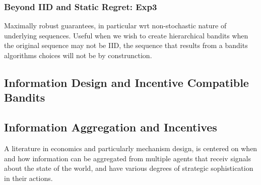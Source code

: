 \subsubsection{Beyond IID and Static Regret: Exp3}

 Maximally robust guarantees, in particular wrt non-stochastic nature of underlying sequences. Useful when we wish to create hierarchical bandits when the original sequence may not be IID, the sequence that results from a bandits algorithms choices will not be by construnction.



\subsection{Information Design and Incentive Compatible Bandits}



 \cite{mansour2015bayesian}





\subsection{Information Aggregation and Incentives}

A literature in economics and particularly mechanism design, is centered on when and how information can be aggregated from multiple agents that receiv signals about the state of the world, and have various degrees of strategic sophistication in their actions.





